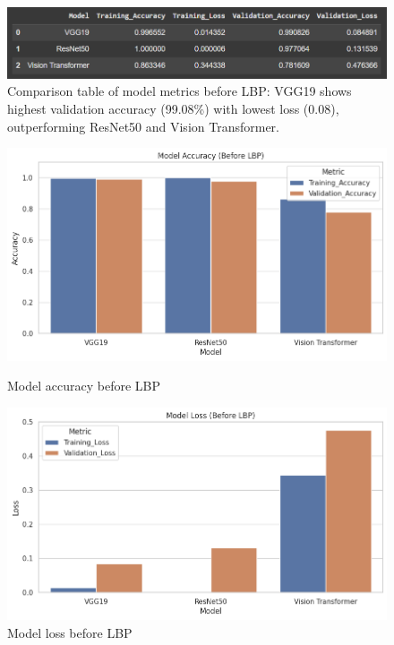 \documentclass{ijclclp}
\begin{document}
\vspace{2em}
\begin{figure}[htbp]
    \centering
    \includegraphics[width=1\textwidth]{image12.png}
    \caption{Comparison table of model metrics before LBP: VGG19 shows highest validation accuracy (99.08\%) with lowest loss (0.08), outperforming ResNet50 and Vision Transformer.}
    \label{fig:comparison_no_lbp}
\end{figure}
\vspace{2.5em}
\begin{figure}[htbp]
    \centering
    \begin{minipage}[b]{0.49\textwidth}
    \includegraphics[width=\textwidth]{image13.png}
    \caption{Model accuracy before LBP}
    \end{minipage}
    \hfill
    \begin{minipage}[b]{0.49\textwidth}
    \includegraphics[width=\textwidth]{image18.png}
    \caption{Model loss before LBP}
    \end{minipage}
\end{figure}
\end{document}
